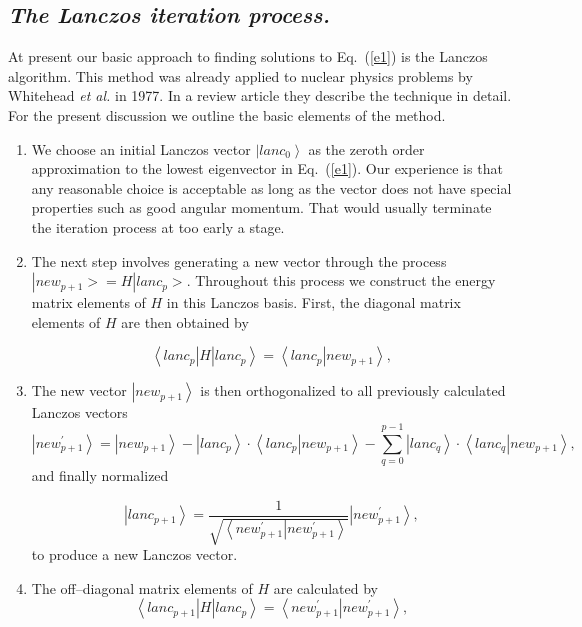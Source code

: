 \documentclass{article}
\newcommand{\be}{\begin{equation}}
\newcommand{\ee}{\end{equation}}
\newcommand{\bra}[1]{\left\langle #1 \right|}
\newcommand{\ket}[1]{\left| #1 \right\rangle}
\begin{document}
\subsection{\it The Lanczos iteration process.}
%
At present our basic approach to finding solutions to Eq.~(\ref{e1})
is the Lanczos algorithm. This method was already applied to nuclear
physics problems by Whitehead {\sl et al.} in 1977.
In a review article \cite{whit77} they describe the technique in detail.
For the present discussion we outline the basic elements
of the method.
\begin{enumerate}
%
\item We choose  an initial Lanczos vector $\ket{lanc_0}$ as the zeroth order
approximation to the lowest eigenvector in Eq.~(\ref{e1}). Our experience
is that any  reasonable choice  is acceptable as long as the
vector does not have special properties such as good angular momentum.
That would usually terminate the iteration process at too early a
stage.
%
\item The next step involves generating a new  vector
through the process $|new_{p+1}> = H |lanc_p>$.
Throughout this process we construct the energy matrix elements
of $H$ in this Lanczos basis. First, the diagonal matrix elements of $H$
are then obtained by

%
\be
\bra{lanc_p} H \ket{lanc_p} = \bra{lanc_p} \left . new_{p+1} \right \rangle,
\label{lanc1}
\ee
%

\item The new vector $\ket{new_{p+1}}$ is then orthogonalized to all
previously calculated Lanczos vectors
%
\be
\ket{new_{p+1}^{'}} = \ket{new_{p+1}} - \ket{lanc_p} \cdot
	                \bra{lanc_p} \left . new_{p+1} \right \rangle		 - \sum_{q = 0}^{p-1} \ket{lanc_q} \cdot
	          \bra{lanc_q} \left . new_{p+1} \right \rangle,
\ee
%
and finally normalized

%
\be
\ket{lanc_{p+1}} = \frac{1}{\sqrt{\bra{new_{p+1}^{'}}
                      \left . new_{p+1}^{'} \right \rangle}}
						\ket{new_{p+1}^{'}},
\ee
%
to produce a new Lanczos vector.
%
\item The off--diagonal matrix elements of $H$ are calculated by
%
\be
\bra{lanc_{p+1}} H \ket{lanc_p} = \bra{new_{p+1}^{'}}
                                \left . new _{p+1}^{'}\right \rangle,
\label{off1}
\ee


\end{enumerate}
\end{document}
